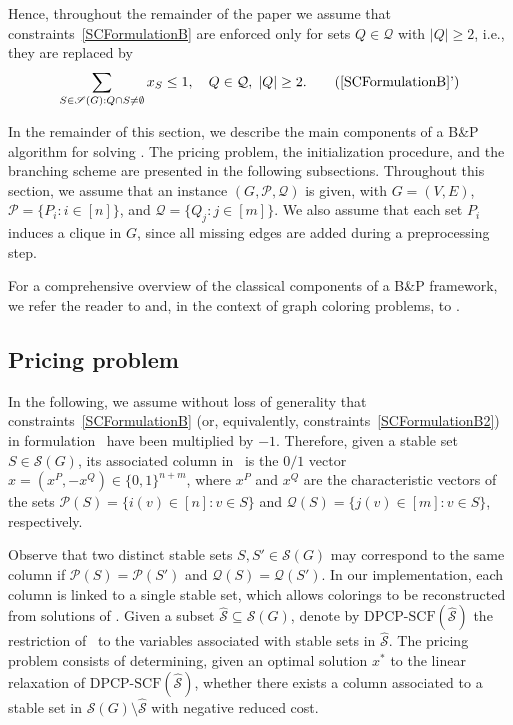 \documentclass[preprint, 11pt, authoryear]{elsarticle}
\newcommand{\PP}{{\mathcal P}}
\newcommand{\QQ}{{\mathcal Q}}
\newcommand{\STAB}{{\mathscr S}}
\newcommand{\card}[1]{\left| #1 \right|}
\newcommand{\setcoveringform}{\text{DPCP-SCF}}
\begin{document}
Hence, throughout the remainder of the paper we assume that constraints~\eqref{SCFormulationB} are enforced only for sets $Q \in \QQ$ with $|Q| \geq 2$, i.e., they are replaced by
\begin{equation}
    \sum_{S \in \STAB(G): Q \cap S \neq \emptyset} x_S \leq 1, \quad  Q \in \QQ, \; \card{Q} \geq 2.
    \tag{\ref{SCFormulationB}'}
    \label{SCFormulationB2}
\end{equation}

In the remainder of this section, we describe the main components of a B\&P algorithm for solving \setcoveringform. The pricing problem, the initialization procedure, and the branching scheme are presented in the following subsections. Throughout this section, we assume that an instance $(G,\PP,\QQ)$ is given, with $G=(V,E)$, $\PP=\{P_i:i\in[n]\}$, and $\QQ=\{Q_j:j\in[m]\}$. We also assume that each set $P_i$ induces a clique in $G$, since all missing edges are added during a preprocessing step.

For a comprehensive overview of the classical components of a B\&P framework, we refer the reader to \cite{Desrosiers2026} and, in the context of graph coloring problems, to \cite{Trick1996,Furini2018}.


\subsection{Pricing problem}\label{sec:branch-and-price-algo-pricing}

In the following, we assume without loss of generality that constraints~\eqref{SCFormulationB} (or, equivalently, constraints~\eqref{SCFormulationB2}) in formulation \setcoveringform\ have been multiplied by $-1$. Therefore, given a stable set $S \in \STAB(G)$, its associated column in \setcoveringform\ is the $0/1$ vector $x = (x^P, -x^Q) \in \{0,1\}^{n+m}$, where $x^P$ and $x^Q$ are the characteristic vectors of the sets
$\PP(S) = \{i(v) \in [n]: v \in S\}$ and $\QQ(S) = \{j(v) \in [m]: v \in S\}$,
respectively.

Observe that two distinct stable sets $S, S' \in \STAB(G)$ may correspond to the same column if $\PP(S) = \PP(S')$ and $\QQ(S) = \QQ(S')$. In our implementation, each column is linked to a single stable set, which allows colorings to be reconstructed from solutions of \setcoveringform.
Given a subset $\hat{\STAB} \subseteq \STAB(G)$, denote by $\setcoveringform(\hat{\STAB})$ the restriction of \setcoveringform\ to the variables associated with stable sets in $\hat{\STAB}$. The pricing problem consists of determining, given an optimal solution $x^*$ to the linear relaxation of $\setcoveringform(\hat{\STAB})$, whether there exists a column associated to a stable set in $\STAB(G) \setminus \hat{\STAB}$ with negative reduced cost.
\end{document}
